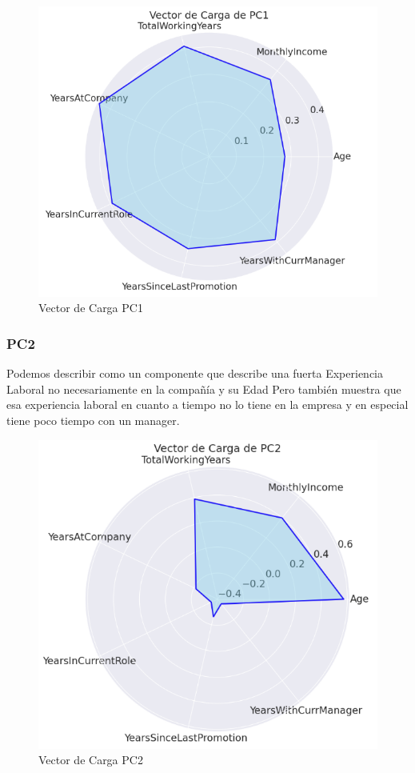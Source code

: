 \begin{figure}[H]
    \centering
    \includegraphics[width=1\textwidth]{images/pollar_pc1.png}
    \caption{Vector de Carga PC1}
    \label{fig:vector_pc1}
\end{figure}

\subsubsection{PC2}

Podemos describir como un componente que describe una fuerta Experiencia Laboral no necesariamente en la compañía y su Edad
Pero también muestra que esa experiencia laboral en cuanto a tiempo no lo tiene en la empresa y en especial tiene
poco tiempo con un manager.

\begin{figure}[H]
    \centering
    \includegraphics[width=1\textwidth]{images/pollar_pc2.png}
    \caption{Vector de Carga PC2}
    \label{fig:vector_pc2}
\end{figure}


